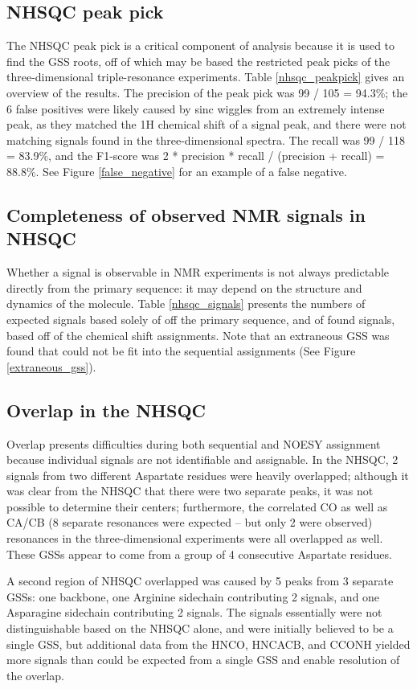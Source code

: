 \subsection*{NHSQC peak pick}
The NHSQC peak pick is a critical component of analysis because it is used
to find the GSS roots, off of which may be based the restricted peak picks of
the three-dimensional triple-resonance experiments.
Table \ref{nhsqc_peakpick} gives an overview of the results.
The precision of the peak pick was 99 / 105 = 94.3\%{}; the 6 false positives 
were likely caused by sinc wiggles from an extremely intense peak, as they
matched the 1H chemical shift of a signal peak, and there were not matching
signals found in the three-dimensional spectra.
The recall was 99 / 118 = 83.9\%{}, and the 
F1-score was 2 * precision * recall / (precision + recall) = 88.8\%{}.
See Figure \ref{false_negative} for an example of a false negative.

\subsection*{Completeness of observed NMR signals in NHSQC}
Whether a signal is observable in NMR experiments is not always predictable
directly from the primary sequence:  it may depend on the structure and
dynamics of the molecule.  Table \ref{nhsqc_signals} presents the numbers
of expected signals based solely of off the primary sequence, and of found 
signals, based off of the chemical shift assignments.  Note that an 
extraneous GSS was found that could not be fit into the sequential assignments
(See Figure \ref{extraneous_gss}).

\subsection*{Overlap in the NHSQC}
Overlap presents difficulties during both sequential and NOESY assignment
because individual signals are not identifiable and assignable.
In the NHSQC, 2 signals from two different Aspartate residues were heavily
overlapped; although it was clear from the NHSQC that there were two separate
peaks, it was not possible to determine their centers; furthermore, the
correlated CO as well as CA/CB (8 separate resonances were expected -- but 
only 2 were observed) resonances in the three-dimensional experiments were all
overlapped as well.  These GSSs appear to come from a group of 4 consecutive
Aspartate residues.

A second region of NHSQC overlapped was caused by 5 peaks from 3 separate 
GSSs: one backbone, one Arginine sidechain contributing 2 signals, and one
Asparagine sidechain contributing 2 signals.  The signals essentially were not
distinguishable based on the NHSQC alone, and were initially believed to be 
a single GSS, but additional data from the HNCO, HNCACB, and CCONH yielded
more signals than could be expected from a single GSS and enable resolution of
the overlap.

